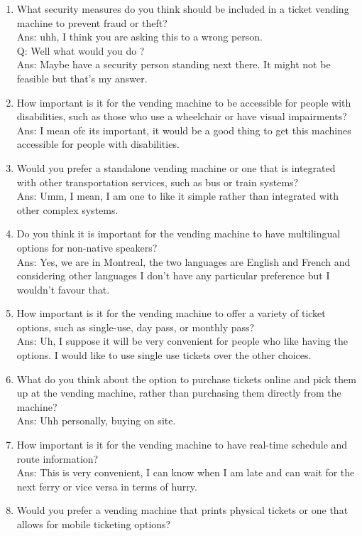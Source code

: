 \begin{enumerate}
    \item What security measures do you think should be included in a ticket vending machine to prevent fraud or theft?\\
Ans: uhh, I think you are asking this to a wrong person.\\
	Q: Well what would you do ?\\
	Ans: Maybe have a security person standing next there. It might not be feasible but that's my answer. 
    \item How important is it for the vending machine to be accessible for people with disabilities, such as those who use a wheelchair or have visual impairments?\\
Ans: I mean ofc its important, it would be a good thing to get this machines accessible for people with disabilities.
    \item Would you prefer a standalone vending machine or one that is integrated with other transportation services, such as bus or train systems?\\
Ans: Umm, I mean, I am one to like it simple rather than integrated with other complex systems.
    \item Do you think it is important for the vending machine to have multilingual options for non-native speakers?\\
Ans: Yes, we are in Montreal, the two languages are English and French and considering other languages I don't have any particular preference but I wouldn’t favour that.
    \item How important is it for the vending machine to offer a variety of ticket options, such as single-use, day pass, or monthly pass?\\
Ans: Uh, I suppose it will be very convenient for people who like having the options. I would like to use single use tickets over the other choices.
    \item What do you think about the option to purchase tickets online and pick them up at the vending machine, rather than purchasing them directly from the machine?\\
Ans: Uhh personally, buying on site.
    \item How important is it for the vending machine to have real-time schedule and route information?\\
Ans: This is very convenient, I can know when I am late and can wait for the next ferry or vice versa in terms of hurry.
    \item Would you prefer a vending machine that prints physical tickets or one that allows for mobile ticketing options?\\

\end{enumerate}
